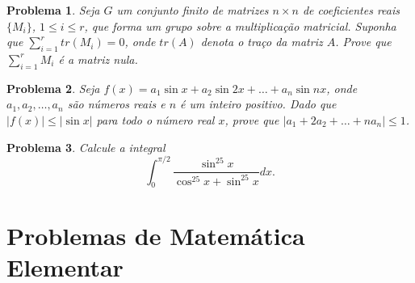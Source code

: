 \documentclass{hipatia}
\newtheorem{problem*}{Problema}
\begin{document}
\begin{problem*}
Seja $G$ um conjunto finito de matrizes $n \times n$ de coeficientes reais $\{M_i\}$, $1 \leq i \leq r$, que forma um grupo sobre a multiplicação matricial. Suponha que $\sum_{i=1}^{r} tr(M_i)=0$, onde $tr(A)$ denota o traço da matriz $A$. Prove que $\sum_{i=1}^r M_i$ é a matriz nula.     
\end{problem*}

\begin{problem*}
Seja $f(x)=a_1\sin x+a_2 \sin 2x+\ldots +a_n \sin nx$, onde $a_1,a_2, \ldots, a_n$ são números reais e $n$ é um inteiro positivo. Dado que $|f(x)|\leq |\sin x|$ para todo o número real $x$, prove que $|a_1+2a_2+\ldots+na_n| \leq 1$.
\end{problem*}

\begin{problem*}
Calcule a integral
$$\displaystyle \int_{0}^{\pi/2} \dfrac{\sin^{25}x}{\cos^{25}x+\sin^{25}x}dx.$$    
\end{problem*}

\section{Problemas de Matemática Elementar}
\end{document}

